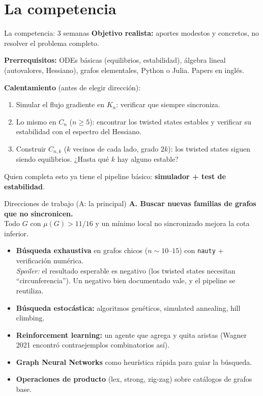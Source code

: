 \documentclass[10pt,aspectratio=169]{beamer}
\begin{document}
\section{La competencia}

\begin{frame}{La competencia: 3 semanas}
\textbf{Objetivo realista:} aportes modestos y concretos, no resolver el problema completo.
\medskip

\textbf{Prerrequisitos:} ODEs básicas (equilibrios, estabilidad), álgebra lineal (autovalores, Hessiano), grafos elementales, Python o Julia. Papers en inglés.
\pause
\medskip

\textbf{Calentamiento} (antes de elegir dirección):
\begin{enumerate}
    \item Simular el flujo gradiente en $K_n$: verificar que siempre sincroniza.
    \item Lo mismo en $C_n$ ($n\ge5$): encontrar los twisted states estables y verificar su estabilidad con el espectro del Hessiano.
    \item Construir $C_{n,k}$ ($k$ vecinos de cada lado, grado $2k$): los twisted states siguen siendo equilibrios. ¿Hasta qué $k$ hay alguno estable?
\end{enumerate}
\medskip
Quien completa esto ya tiene el pipeline básico: \textbf{simulador + test de estabilidad}.
\end{frame}

\begin{frame}{Direcciones de trabajo (A: la principal)}
\textbf{A. Buscar nuevas familias de grafos que no sincronicen.}\\
Todo $G$ con $\mu(G) > 11/16$ y un mínimo local no sincronizado mejora la cota inferior.
\medskip
\begin{itemize}
    \item \textbf{Búsqueda exhaustiva} en grafos chicos ($n \sim 10$--$15$) con \texttt{nauty} + verificación numérica.\\
    \emph{Spoiler:} el resultado esperable es negativo (los twisted states necesitan ``circunferencia''). Un negativo bien documentado vale, y el pipeline se reutiliza.
    \item \textbf{Búsqueda estocástica:} algoritmos genéticos, simulated annealing, hill climbing.
    \item \textbf{Reinforcement learning:} un agente que agrega y quita aristas (Wagner 2021 encontró contraejemplos combinatorios así).
    \item \textbf{Graph Neural Networks} como heurística rápida para guiar la búsqueda.
    \item \textbf{Operaciones de producto} (lex, strong, zig-zag) sobre catálogos de grafos base.
\end{itemize}
\end{frame}
\end{document}
